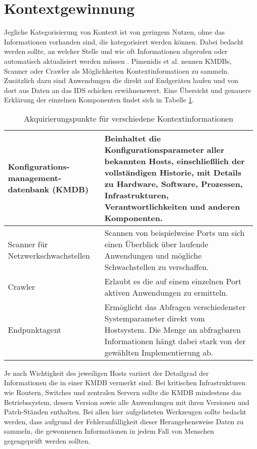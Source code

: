 \section{Kontextgewinnung}
Jegliche Kategorisierung von Kontext ist von geringem Nutzen, ohne das Informationen vorhanden sind, die kategorisiert werden können. Dabei bedacht werden sollte, an welcher Stelle und wie oft Informationen abgerufen oder automatisch aktualisiert werden müssen \cite{perera_context_2014}. Pimenidis et al. \cite{pimenidis2008context} nennen KMDBs, Scanner oder Crawler als Möglichkeiten Kontextinformatioen zu sammeln. Zusätzlich dazu sind Anwendungen die direkt auf Endgeräten laufen und von dort aus Daten an das IDS schicken erwähnenswert. Eine Übersicht und genauere Erklärung der einzelnen Komponenten findet sich in Tabelle \ref{Tabelle_2}. 
\begin{table}[H]
\label{Tabelle_2}
\caption{Akquirierungspunkte für verschiedene Kontextinformationen}
\begin{tabularx}{\columnwidth}{p{3cm} p{10cm}}
\toprule
Konfigurations-management-datenbank (KMDB) & 
Beinhaltet die Konfigurationsparameter aller bekannten Hosts, einschließlich der vollständigen Historie, mit Details zu Hardware, Software, Prozessen, Infrastrukturen, Verantwortlichkeiten und anderen Komponenten.\\
\midrule
Scanner für Netzwerkschwachstellen &  Scannen von beispielweise Ports um sich einen Überblick über laufende Anwendungen und mögliche Schwachstellen zu verschaffen. \\
\midrule
Crawler & Erlaubt es die auf einem einzelnen Port aktiven Anwendungen zu ermitteln.\\
\midrule
Endpunktagent & Ermöglicht das Abfragen verschiedenster Systemparameter direkt vom Hostsystem. Die Menge an abfragbaren Informationen hängt dabei stark von der gewählten Implementierung ab.\\
\bottomrule
\end{tabularx}
\end{table}
Je nach Wichtigkeit des jeweiligen Hosts variiert der Detailgrad der Informationen die in einer KMDB vermerkt sind. Bei kritischen Infrastrukturen wie Routern, Switches und zentralen Servern sollte die KMDB mindestens das Betriebssystem, dessen Version sowie alle Anwendungen mit ihren Versionen und Patch-Ständen enthalten. Bei allen hier aufgelisteten Werkzeugen sollte bedacht werden, dass aufgrund der Fehleranfälligkeit dieser Herangehensweise Daten zu sammeln, die gewonnenen Informationen in jedem Fall von Menschen gegengeprüft werden sollten.
